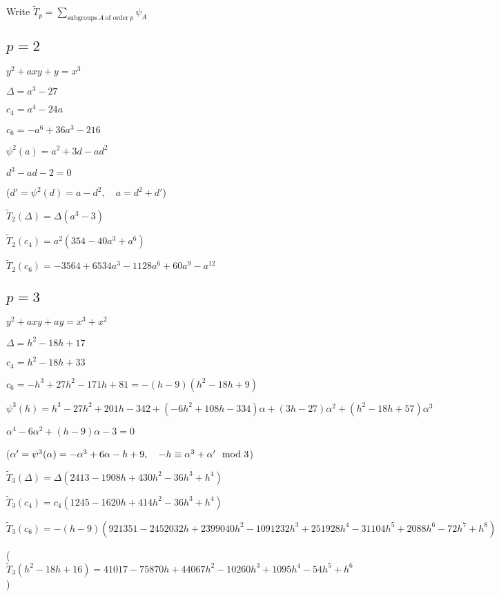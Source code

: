 \documentclass{rs}
\theoremstyle{definition}
\theoremstyle{remark}
\newcommand{\md}{~~{\rm mod}~}
\newcommand{\A}{\alpha}
\numberwithin{equation}{section}
\numberwithin{thm}{section}
\begin{document}
Write $\tilde{T}_p = \sum_{\text{subgroups} ~ A ~ \text{of order} ~ p} \psi_A$ 

\subsection*{$p = 2$}

$y^2 + a x y + y = x^3$ 

$\Delta = a^3 - 27$ 

$c_4 = a^4 - 24 a$ 

$c_6 = -a^6 + 36 a^3 - 216$ 

$\psi^2(a) = a^2 + 3 d - a d^2$ 

$d^3 - a d - 2 = 0$ 

($d' = \psi^2(d) = a - d^2, \quad a = d^2 + d'$) 

$\tilde{T}_2(\Delta) = \Delta (a^3 - 3)$ 

$\tilde{T}_2(c_4) = a^2 (354 - 40 a^3 + a^6)$ 

$\tilde{T}_2(c_6) = -3564 + 6534 a^3 - 1128 a^6 + 60 a^9 - a^{12}$ 

\subsection*{$p = 3$}

$y^2 + a x y + a y = x^3 + x^2$ 

$\Delta = h^2 - 18 h + 17$ 

$c_4 = h^2 - 18 h + 33$ 

$c_6 = -h^3 + 27 h^2 - 171 h + 81 = -(h - 9) (h^2 - 18 h + 9)$ 

$\psi^3(h) = h^3 - 27 h^2 + 201 h - 342 + (-6 h^2 + 108 h - 334) \A + (3 h - 27) \A^2 + (h^2 - 18 h + 57) \A^3$ 

$\A^4 - 6 \A^2 + (h - 9) \A - 3 = 0$ 

($\A' = \psi^3(\A) = -\A^3 + 6 \A - h + 9, \quad -h \equiv \A^3 + \A' \md 3$) 

$\tilde{T}_3(\Delta) = \Delta (2413 - 1908 h + 430 h^2 - 36 h^3 + h^4)$ 

$\tilde{T}_3(c_4) = c_4 (1245 - 1620 h + 414 h^2 - 36 h^3 + h^4)$ 

$\tilde{T}_3(c_6) = -(h - 9) (921351 - 2452032 h + 2399040 h^2 - 1091232 h^3 + 251928 h^4 - 31104 h^5 + 2088 h^6 - 72 h^7 + h^8)$ 

($\tilde{T}_3(h^2 - 18 h + 16) = 41017 - 75870 h + 44067 h^2 - 10260 h^3 + 1095 h^4 - 54 h^5 + h^6$) 
\end{document}
